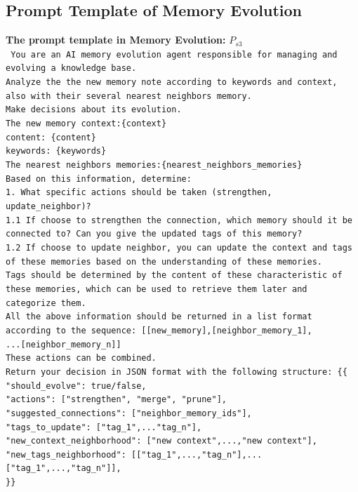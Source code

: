 \documentclass{article}
\begin{document}
\clearpage

\subsection{Prompt Template of Memory Evolution}
\begin{tcolorbox}[colback=white!95!gray, colframe=black, width=1\textwidth, arc=4mm, boxrule=0.5mm]
\noindent \textbf{The prompt template in Memory Evolution:} $P_{s3}$\\  
\texttt{ You are an AI memory evolution agent responsible for managing and evolving a knowledge base. \\
Analyze the the new memory note according to keywords and context, also with their several nearest neighbors memory. \\
Make decisions about its evolution.  \\
The new memory context:\{context\}\\
content: \{content\} \\
keywords: \{keywords\} \\
The nearest neighbors memories:\{nearest\_neighbors\_memories\} \\
Based on this information, determine: \\
1. What specific actions should be taken (strengthen, update\_neighbor)? \\
   1.1 If choose to strengthen the connection, which memory should it be connected to? Can you give the updated tags of this memory? \\
   1.2 If choose to update neighbor, you can update the context and tags of these memories based on the understanding of these memories. \\
Tags should be determined by the content of these characteristic of these memories, which can be used to retrieve them later and categorize them. \\
All the above information should be returned in a list format according to the sequence: [[new\_memory],[neighbor\_memory\_1],\\...[neighbor\_memory\_n]] \\
These actions can be combined. \\
Return your decision in JSON format with the following structure:
\{\{ \\
    "should\_evolve": true/false, \\
    "actions": ["strengthen", "merge", "prune"], \\ 
    "suggested\_connections": ["neighbor\_memory\_ids"], \\
    "tags\_to\_update": ["tag\_1",..."tag\_n"],  \\
    "new\_context\_neighborhood": ["new context",...,"new context"], \\
    "new\_tags\_neighborhood": [["tag\_1",...,"tag\_n"],...["tag\_1",...,"tag\_n"]], \\
\}\} } 
\end{tcolorbox}
\clearpage
\end{document}

